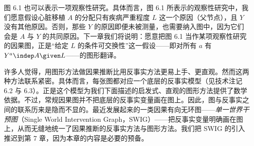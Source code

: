 \begin{figure}[htbp]
\centering
{}
\caption{}
\label{fig:6.2}
\end{figure}

图 6.1 也可以表示一项观察性研究。具体而言，图 6.1 所表示的观察性研究中，我们愿意假设心脏移植 $A$ 的分配只有疾病严重程度 $L$ 这一个原因（父节点），且 $Y$ 没有其他原因。否则，那些 $Y$ 的原因即便未被测量，也需要纳入图中，因为它们会是 $A$ 与 $Y$ 的共同原因。下一章我们将说明：愿意把图 6.1 当作某项观察性研究的因果图，正是“给定 $L$ 的条件可交换性”这一假设——即对所有 $a$ 有 $Y^{a}\indep A\given L$——的图形翻译。

许多人觉得，用图形方法做因果推断比用反事实方法更易上手、更直观。然而这两种方法联系紧密。具体而言，每张图都对应一个底层的反事实模型（见技术注记 6.2 与 6.3）。正是这个模型为我们下面描述的启发式、直观的图形方法提供了数学依据。不过，常规因果图并不把底层的反事实变量画在图上。因此，图与反事实之间的联系历来是隐而不显的。最近发展起来的一类因果有向无环图——\emph{单一世界干预图}（Single World Intervention Graph，SWIG）——把反事实变量明确画在图上，从而无缝地统一了因果推断的反事实方法与图形方法。我们把 SWIG 的引入推迟到第 7 章，因为本章的内容是必要的预备。


